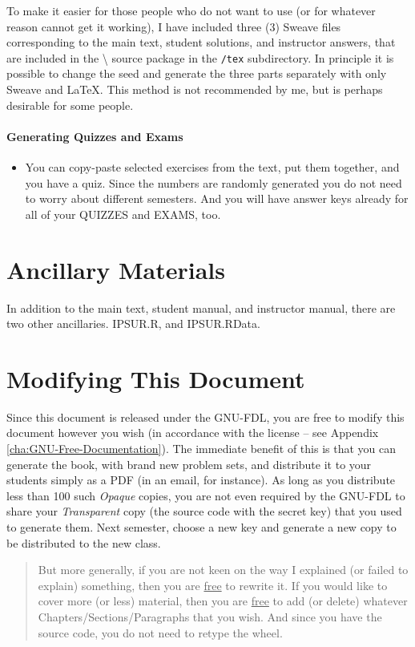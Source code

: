 \documentclass[captions=tableheading]{scrbook}
\begin{document}
To make it easier for those people who do not want to use \LyX{} (or for whatever reason cannot get it working), I have included three (3) Sweave files corresponding to the main text, student solutions, and instructor answers, that are included in the \IPSUR\textbackslash{} source package in the \texttt{/tex} subdirectory. In principle it is possible to change the seed and generate the three parts separately with only Sweave and \LaTeX{}. This method is not recommended by me, but is perhaps desirable for some people.

\paragraph*{Generating Quizzes and Exams}
\begin{itemize}
\item You can copy-paste selected exercises from the text, put them together, and you have a quiz. Since the numbers are randomly generated you do not need to worry about different semesters. And you will have answer keys already for all of your QUIZZES and EXAMS, too.
\end{itemize}
\section{Ancillary Materials \label{sec:Ancillary-Materials}}
\label{sec-23-3}

In addition to the main text, student manual, and instructor manual, there are two other ancillaries. IPSUR.R, and IPSUR.RData.
\section{Modifying This Document \label{sec:Modifying-This-Document}}
\label{sec-23-4}

Since this document is released under the GNU-FDL, you are free to modify this document however you wish (in accordance with the license -- see Appendix \ref{cha:GNU-Free-Documentation}). The immediate benefit of this is that you can generate the book, with brand new problem sets, and distribute it to your students simply as a PDF (in an email, for instance). As long as you distribute less than 100 such \emph{Opaque} copies, you are not even required by the GNU-FDL to share your \emph{Transparent} copy (the source code with the secret key) that you used to generate them. Next semester, choose a new key and generate a new copy to be distributed to the new class. 

\begin{quote}
But more generally, if you are not keen on the way I explained (or failed to explain) something, then you are \underline{free} to rewrite it. If you would like to cover more (or less) material, then you are \underline{free} to add (or delete) whatever Chapters/Sections/Paragraphs that you wish. And since you have the source code, you do not need to retype the wheel. 
\end{quote}
\end{document}
